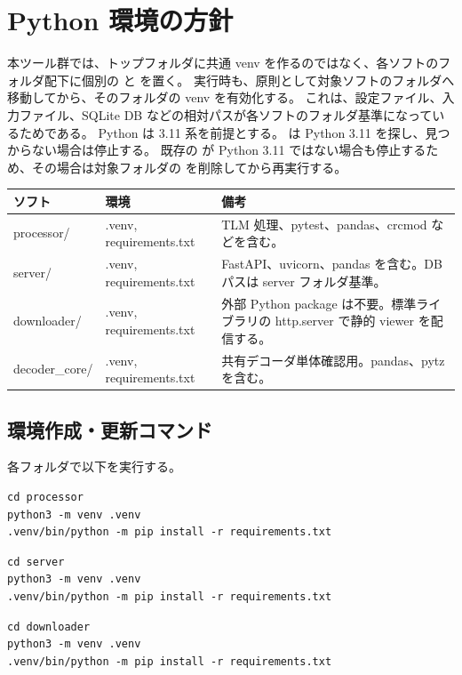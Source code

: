 \documentclass[a4paper,11pt]{ltjsarticle}
\begin{document}
\section{Python 環境の方針}

本ツール群では、トップフォルダに共通 venv を作るのではなく、各ソフトのフォルダ配下に個別の  と  を置く。
実行時も、原則として対象ソフトのフォルダへ移動してから、そのフォルダの venv を有効化する。
これは、設定ファイル、入力ファイル、SQLite DB などの相対パスが各ソフトのフォルダ基準になっているためである。
Python は 3.11 系を前提とする。
 は Python 3.11 を探し、見つからない場合は停止する。
既存の  が Python 3.11 ではない場合も停止するため、その場合は対象フォルダの  を削除してから再実行する。

\begin{center}
\begin{tabular}{>{\ttfamily}p{34mm}p{34mm}p{72mm}}
\toprule
ソフト & 環境 & 備考 \\
\midrule
processor/ & .venv, requirements.txt & TLM 処理、pytest、pandas、crcmod などを含む。 \\
server/ & .venv, requirements.txt & FastAPI、uvicorn、pandas を含む。DB パスは server フォルダ基準。 \\
downloader/ & .venv, requirements.txt & 外部 Python package は不要。標準ライブラリの http.server で静的 viewer を配信する。 \\
decoder\_core/ & .venv, requirements.txt & 共有デコーダ単体確認用。pandas、pytz を含む。 \\
\bottomrule
\end{tabular}
\end{center}

\subsection{環境作成・更新コマンド}

各フォルダで以下を実行する。

\begin{verbatim}
cd processor
python3 -m venv .venv
.venv/bin/python -m pip install -r requirements.txt
\end{verbatim}

\begin{verbatim}
cd server
python3 -m venv .venv
.venv/bin/python -m pip install -r requirements.txt
\end{verbatim}

\begin{verbatim}
cd downloader
python3 -m venv .venv
.venv/bin/python -m pip install -r requirements.txt
\end{verbatim}
\end{document}
